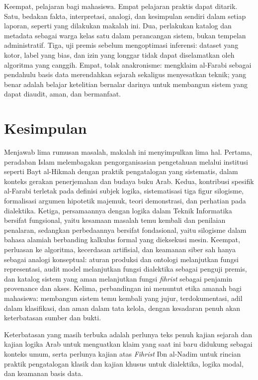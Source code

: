 \documentclass[12pt,a4paper]{article}
\begin{document}
Keempat, pelajaran bagi mahasiswa. Empat pelajaran praktis dapat ditarik. Satu, bedakan fakta, interpretasi, analogi, dan kesimpulan sendiri dalam setiap laporan, seperti yang dilakukan makalah ini. Dua, perlakukan katalog dan metadata sebagai warga kelas satu dalam perancangan sistem, bukan tempelan administratif. Tiga, uji premis sebelum mengoptimasi inferensi: dataset yang kotor, label yang bias, dan izin yang longgar tidak dapat diselamatkan oleh algoritma yang canggih. Empat, tolak anakronisme: mengklaim al-Farabi sebagai pendahulu basis data merendahkan sejarah sekaligus menyesatkan teknik; yang benar adalah belajar ketelitian bernalar darinya untuk membangun sistem yang dapat diaudit, aman, dan bermanfaat.

\section{Kesimpulan}

Menjawab lima rumusan masalah, makalah ini menyimpulkan lima hal. Pertama, peradaban Islam melembagakan pengorganisasian pengetahuan melalui institusi seperti Bayt al-Hikmah dengan praktik pengatalogan yang sistematis, dalam konteks gerakan penerjemahan dan budaya buku Arab. Kedua, kontribusi spesifik al-Farabi terletak pada definisi subjek logika, sistematisasi tiga figur silogisme, formalisasi argumen hipotetik majemuk, teori demonstrasi, dan perhatian pada dialektika. Ketiga, persamaannya dengan logika dalam Teknik Informatika bersifat fungsional, yaitu kesamaan masalah temu kembali dan penilaian penalaran, sedangkan perbedaannya bersifat fondasional, yaitu silogisme dalam bahasa alamiah berbanding kalkulus formal yang dieksekusi mesin. Keempat, perluasan ke algoritma, kecerdasan artifisial, dan keamanan siber sah hanya sebagai analogi konseptual: aturan produksi dan ontologi melanjutkan fungsi representasi, audit model melanjutkan fungsi dialektika sebagai penguji premis, dan katalog sistem yang aman melanjutkan fungsi \emph{fihrist} sebagai penjamin provenance dan akses. Kelima, perbandingan ini menuntut etika amanah bagi mahasiswa: membangun sistem temu kembali yang jujur, terdokumentasi, adil dalam klasifikasi, dan aman dalam tata kelola, dengan kesadaran penuh akan keterbatasan sumber dan bukti.

Keterbatasan yang masih terbuka adalah perlunya teks penuh kajian sejarah dan kajian logika Arab untuk menguatkan klaim yang saat ini baru didukung sebagai konteks umum, serta perlunya kajian atas \emph{Fihrist} Ibn al-Nadim untuk rincian praktik pengatalogan klasik dan kajian khusus untuk dialektika, logika modal, dan keamanan basis data.

\clearpage
\printbibliography[title=Daftar Pustaka]
\end{document}
